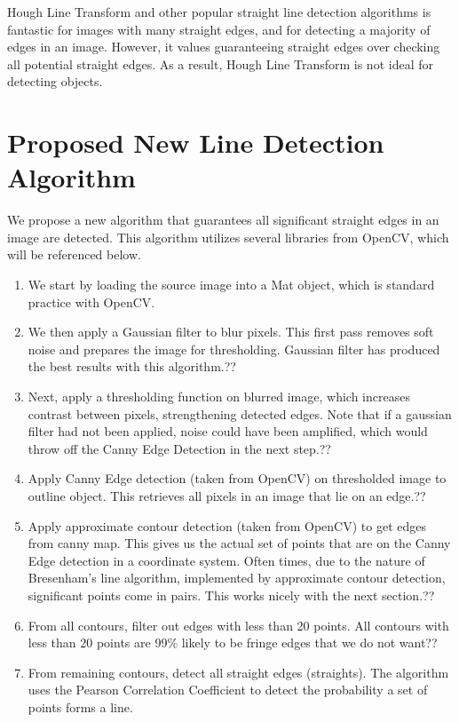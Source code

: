 \documentclass[12pt]{article}
\begin{document}
Hough Line Transform and other popular straight line detection algorithms is fantastic for images with many straight edges, and for detecting a majority of edges in an image. However, it values guaranteeing straight edges over checking all potential straight edges. As a result, Hough Line Transform is not ideal for detecting objects.

\section{Proposed New Line Detection Algorithm}

We propose a new algorithm that guarantees all significant straight edges in an image are detected. This algorithm utilizes several libraries from OpenCV, which will be referenced below.

\begin{enumerate}

\item We start by loading the source image into a Mat object, which is standard practice with OpenCV.

\item We then apply a Gaussian filter to blur pixels. This first pass removes soft noise and prepares the image for thresholding. Gaussian filter has produced the best results with this algorithm.??\item Next, apply a thresholding function on blurred image, which increases contrast between pixels, strengthening detected edges. Note that if a gaussian filter had not been applied, noise could have been amplified, which would throw off the Canny Edge Detection in the next step.??
\item Apply Canny Edge detection (taken from OpenCV) on thresholded image to outline object. This retrieves all pixels in an image that lie on an edge.??
\item Apply approximate contour detection (taken from OpenCV) to get edges from canny map. This gives us the actual set of points that are on the Canny Edge detection in a coordinate system. Often times, due to the nature of Bresenham's line algorithm, implemented by approximate contour detection, significant points come in pairs. This works nicely with the next section.??
\item From all contours, filter out edges with less than 20 points. All contours with less than 20 points are 99\% likely to be fringe edges that we do not want??
\item From remaining contours, detect all straight edges (straights). The algorithm uses the Pearson Correlation Coefficient to detect the probability a set of points forms a line.


\end{enumerate}
\end{document}
